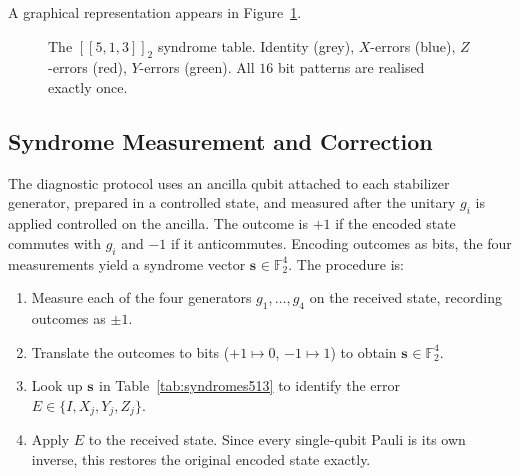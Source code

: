 \documentclass[11pt,a4paper]{article}
\theoremstyle{definition}
\newcommand{\sk}[1][]{\mathbf{s}_{#1}}
\newcommand{\Fbb}{\mathbb{F}}
\begin{document}
A graphical representation appears in Figure~\ref{fig:syn_grid}.

\begin{figure}[h]
\centering
{}
\caption{The $[\![5,1,3]\!]_2$ syndrome table. Identity (grey), $X$-errors (blue), $Z$-errors (red), $Y$-errors (green). All $16$ bit patterns are realised exactly once.}
\label{fig:syn_grid}
\end{figure}

\subsection{Syndrome Measurement and Correction}
\label{sec:513_meas}

The diagnostic protocol uses an ancilla qubit attached to each stabilizer generator, prepared in a controlled state, and measured after the unitary $g_i$ is applied controlled on the ancilla. The outcome is $+1$ if the encoded state commutes with $g_i$ and $-1$ if it anticommutes. Encoding outcomes as bits, the four measurements
yield a syndrome vector $\sk\in\Fbb_2^4$. The procedure is:
\begin{enumerate}[nosep]
  \item Measure each of the four generators $g_1,\dots,g_4$ on the received state, recording outcomes as $\pm 1$.
  \item Translate the outcomes to bits ($+1\mapsto 0$, $-1\mapsto 1$) to obtain $\sk\in\Fbb_2^4$.
  \item Look up $\sk$ in Table~\ref{tab:syndromes513} to identify the error $E\in\{I,X_j,Y_j,Z_j\}$.
  \item Apply $E$ to the received state. Since every single-qubit Pauli is its own inverse, this restores the original encoded state exactly.
\end{enumerate}
\end{document}
